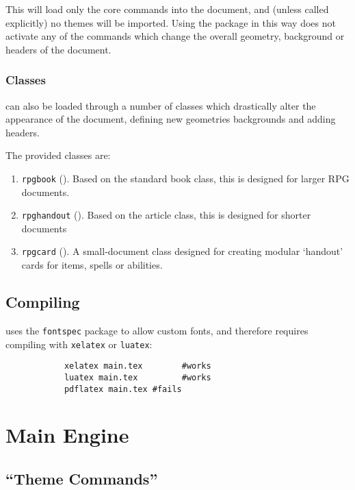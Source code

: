 			This will load only the core commands into the document, and (unless called explicitly) no themes will be imported. Using the package in this way does not activate any of the commands which change the overall geometry, background or headers of the document.

		\subsection{Classes}

			\rpgtex{} can also be loaded through a number of classes which drastically alter the appearance of the document, defining new geometries backgrounds and adding headers.

			The provided classes are:
			\begin{enumerate}
				\item \texttt{rpgbook} (). Based on the standard book class, this is designed for larger RPG documents.
				\item \texttt{rpghandout} (). Based on the article class, this is designed for shorter documents
				\item \texttt{rpgcard} (). A small-document class designed for creating modular `handout' cards for items, spells or abilities.
			\end{enumerate}
	\section{Compiling}

		\rpgtex{} uses the \texttt{fontspec} package to allow custom fonts, and therefore requires compiling with \texttt{xelatex} or \texttt{luatex}:

		\begin{lstlisting}
			xelatex main.tex		#works
			luatex main.tex			#works
			pdflatex main.tex #fails
		\end{lstlisting}

\onecolumn




\chapter{Main Engine}

	\section{``Theme Commands''}\label{S:ThemeCommands}

